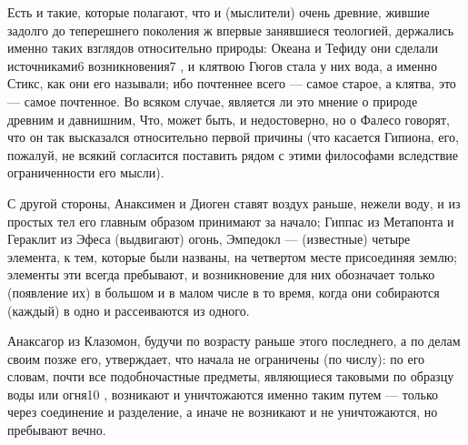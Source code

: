 \documentclass{article}
\begin{document}
Есть и такие, которые полагают, что и (мыслители) очень древние, жившие задолго до теперешнего поколения ж впервые занявшиеся теологией, держались именно таких взглядов относительно природы: Океана и Тефиду
\footnotemark[6]
они сделали источниками6  возникновения7 , и клятвою Гюгов стала у них вода, а именно Стикс, как они его называли; ибо почтеннее всего — самое старое, а клятва, это — самое почтенное. Во всяком случае, является ли это мнение о природе древним и давнишним, Что, может быть, и недостоверно, но о Фалесо говорят, что он так высказался относительно первой причины (что касается Гипиона,
\footnotemark[7]
его, пожалуй, не всякий согласится поставить рядом с этими философами вследствие ограниченности его мысли).

С другой стороны, Анаксимен и Диоген
\footnotemark[8]
ставят воздух раньше, нежели воду, и из простых
\footnotemark[10]
тел его главным образом принимают за начало; Гиппас из Метапонта
\footnotemark[11]
и Гераклит из Эфеса (выдвигают) огонь, Эмпедокл — (известные) четыре элемента, к тем, которые были названы,
\footnotemark[12]
на четвертом месте присоединяя землю; элементы эти всегда пребывают, и возникновение
\footnotemark[13]
для них обозначает только (появление их) в большом и в малом
\footnotemark[9]
числе в то время, когда они собираются (каждый) в одно и рассеиваются из одного.

Анаксагор из Клазомон, будучи по возрасту раньше этого последнего, а по делам своим позже его, утверждает, что начала не ограничены (по числу): по его словам, почти все подобночастные
\footnotemark[14]
предметы, являющиеся таковыми по образцу воды или огня10 , возникают и уничтожаются именно таким путем
\footnotemark[14]
— только через соединение и разделение, а иначе не возникают и не уничтожаются, но пребывают вечно.
\end{document}
